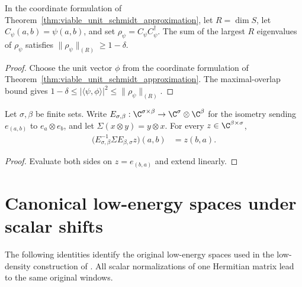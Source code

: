 \begin{theorem}
    \label{thm:viable_leading_marginal_mass}
    \leanok
    In the coordinate formulation of
    Theorem~\ref{thm:viable_unit_schmidt_approximation}, let
    $R=\dim S$, let $C_\psi(a,b)=\psi(a,b)$, and set
    $\rho_\psi=C_\psi C_\psi^\dagger$.
    The sum of the largest $R$ eigenvalues of $\rho_\psi$ satisfies
    $\|\rho_\psi\|_{(R)}\ge1-\delta$.
\end{theorem}

\begin{proof}
    \leanok
    Choose the unit vector $\phi$ from the coordinate formulation of
    Theorem~\ref{thm:viable_unit_schmidt_approximation}.
    The maximal-overlap bound gives
    $1-\delta\le|\langle\psi,\phi\rangle|^2
        \le\|\rho_\psi\|_{(R)}$.
\end{proof}

\begin{theorem}
    \label{thm:tensor_exchange_product_coordinates}
    \leanok
    Let $\sigma,\beta$ be finite sets. Write
    $E_{\sigma,\beta}:\C^{\sigma\times\beta}\to
        \C^\sigma\otimes\C^\beta$ for the isometry sending
    $e_{(a,b)}$ to $e_a\otimes e_b$, and let
    $\Sigma(x\otimes y)=y\otimes x$.
    For every $z\in\C^{\beta\times\sigma}$,
    \begin{align}
        \bigl(E_{\sigma,\beta}^{-1}\Sigma E_{\beta,\sigma}z\bigr)(a,b)
         & =z(b,a).
        \label{eq:tensor_exchange_coordinates}
    \end{align}
\end{theorem}
\begin{proof}
    \leanok
    Evaluate both sides on $z=e_{(b,a)}$ and extend linearly.
\end{proof}

\section{Canonical low-energy spaces under scalar shifts}

The following identities identify the original low-energy spaces used in
the low-density construction of \cite{Arad2016RigorousRG}. All scalar
normalizations of one Hermitian matrix lead to the same original windows.

